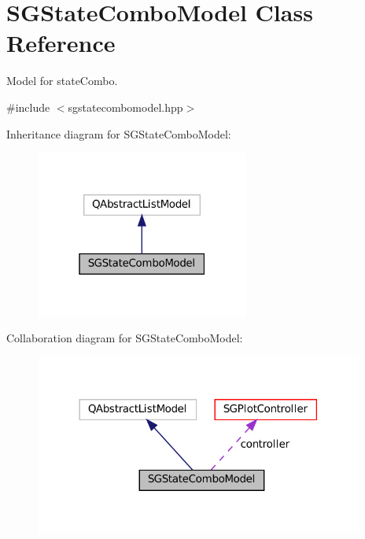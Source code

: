 \hypertarget{classSGStateComboModel}{}\section{S\+G\+State\+Combo\+Model Class Reference}
\label{classSGStateComboModel}


Model for state\+Combo.  




{\ttfamily \#include $<$sgstatecombomodel.\+hpp$>$}



Inheritance diagram for S\+G\+State\+Combo\+Model\+:
\nopagebreak
\begin{figure}[H]
\begin{center}
\leavevmode
\includegraphics[width=199pt]{classSGStateComboModel__inherit__graph}
\end{center}
\end{figure}


Collaboration diagram for S\+G\+State\+Combo\+Model\+:
\nopagebreak
\begin{figure}[H]
\begin{center}
\leavevmode
\includegraphics[width=306pt]{classSGStateComboModel__coll__graph}
\end{center}
\end{figure}
